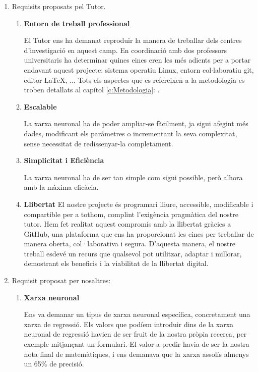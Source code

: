 \begin{enumerate}
 \item Requisits proposats pel Tutor.
    \begin{enumerate}
        \item \textbf{Entorn de treball professional}

        El Tutor ens ha demanat reproduir la manera de treballar dels centres d'investigació en aquest camp. En coordinació amb dos professors universitaris ha determinar quines eines eren les més adients per a portar endavant aquest projecte: sistema operatiu Linux, entorn col$\cdot$laboratiu git, editor LaTeX, ... Tots els aspectes que es refereixen a la metodologia es troben detallats al capítol \ref{c:Metodologia}: .

        \item \textbf{Escalable}

        La xarxa neuronal ha de poder ampliar-se fàcilment, ja sigui afegint més dades, modificant els paràmetres o incrementant la seva complexitat, sense necessitat de redissenyar-la completament.

        \item \textbf{Simplicitat i Eficiència}

        La xarxa neuronal ha de ser tan simple com sigui possible, però alhora amb la màxima eficàcia.

        \item \textbf{Llibertat}
        El nostre projecte és programari lliure\cite{ProgramariLliure}, accessible, modificable i compartible per a tothom, complint l'exigència pragmàtica del nostre tutor. Hem fet realitat aquest compromís amb la llibertat gràcies a GitHub\cite{GitHub}, una plataforma que ens ha proporcionat les eines per treballar de manera oberta, col·laborativa i segura. D’aquesta manera, el nostre treball esdevé un recurs que qualsevol pot utilitzar, adaptar i millorar, demostrant els beneficis i la viabilitat de la llibertat digital.

    \end{enumerate}

 \item Requisit proposat per nosaltres:
    \begin{enumerate}
        \item \textbf{Xarxa neuronal}

        Ens va demanar un tipus de xarxa neuronal específica, concretament una xarxa de regressió. Els valors que podíem introduir dins de la xarxa neuronal de regressió havien de ser fruit de la nostra pròpia recerca, per exemple mitjançant un formulari. El valor a predir havia de ser la nostra nota final de matemàtiques, i ens demanava que la xarxa assolís almenys un 65\% de precisió.


\end{enumerate}
\end{enumerate}
